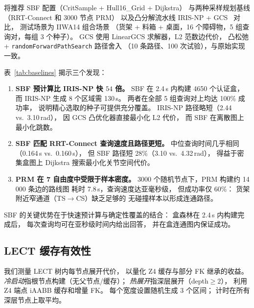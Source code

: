 \documentclass[journal]{IEEEtran}
\begin{document}
将推荐 SBF 配置（CritSample + Hull16\_Grid + Dijkstra）
与两种采样规划基线（RRT-Connect 和 3000 节点 PRM）
以及凸分解流水线 IRIS-NP + GCS~\cite{marcucci2024motion} 对比，
测试场景为 IIWA14 组合场景
（货架 + 料箱 + 桌面，16 个障碍物，5 组查询对，每组 3 个种子）。
GCS 使用 LinearGCS 求解器，L2 范数边代价，
凸松弛 + \texttt{randomForwardPathSearch} 路径舍入
（10 条路径、100 次试验），与原始实现一致。



表~\ref{tab:baselines} 揭示三个发现：
\begin{enumerate}
  \item \textbf{SBF 预计算比 IRIS-NP 快 $54$ 倍。}
    SBF 在 2.4\,s 内构建 4650 个认证盒，
    而 IRIS-NP 生成 8 个区域需 130\,s。
    两者在全部 5 组查询对上均达 100\% 成功率，
    说明精心选取的种子可提供充分覆盖。
    IRIS-NP 路径略短（2.44 vs.\ 3.10\,rad），
    因 GCS 凸优化器直接最小化 L2 代价，
    而 SBF 在离散图上最小化跳数。

  \item \textbf{SBF 匹配 RRT-Connect 查询速度且路径更短。}
    中位查询时间几乎相同（0.164\,s vs.\ 0.160\,s），
    但 SBF 路径短 28\%（3.10 vs.\ 4.32\,rad），
    得益于密集盒图上 Dijkstra 搜索最小化关节空间代价。

  \item \textbf{PRM 在 7 自由度中受限于样本密度。}
    3000 个随机节点下，PRM 构建约 14\,000 条边的路线图
    耗时 7.8\,s，查询速度达亚毫秒级，
    但成功率仅 60\%：
    货架附近窄通道（TS$\to$CS）缺乏足够的
    无碰撞样本以形成连通路径。
\end{enumerate}

SBF 的关键优势在于快速预计算与确定性覆盖的结合：
盒森林在 2.4\,s 内构建完成后，
每次查询均可在亚秒级时间内给出回答，
并在盒连通图内保证成功。

\subsection{LECT 缓存有效性}\label{sec:exp_lect}

我们测量 LECT 树内每节点展开代价，
以量化 Z4 缓存与部分 FK 继承的收益。
\emph{冷启动}指根节点构建（无父节点/缓存）；
\emph{热展开}指深层展开（depth${\geq}2$），
利用 Z4 端点 iAABB 缓存和增量 FK。
每个宽度设置随机生成 3 个区间；
计时在所有深层节点上取平均。


\end{document}
